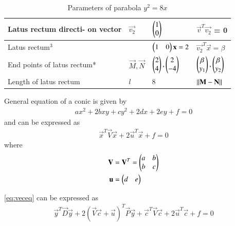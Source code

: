 \documentclass[journal,12pt,twocolumn]{IEEEtran}
\begin{document}
\begin{table}[!ht]
\begin{center}
\begin{tabular}{ | m{1.4cm} | m{1.0cm}| m{2.4cm} | m{2.3cm} | }
\hline
Latus \newline rectum \newline directi- \newline on vector & $\vec{v_2}$ & $\begin{pmatrix}1 \\ 0\end{pmatrix}$ & $\vec{v}^T\vec{v_2}$ = 0 \\ 
\hline
Latus \newline rectum$^{3}$ & & $\begin{pmatrix}1 & 0\end{pmatrix}\mathbf{x}=2$ & $\vec{v_2}^T\vec{x}=\beta$\\
\hline
End \newline points \newline of latus \newline rectum* & $\vec{M},\vec{N}$ & $\begin{pmatrix}2\\4\end{pmatrix},\begin{pmatrix}2\\-4\end{pmatrix}$ & $\begin{pmatrix}\beta \\ y_1\end{pmatrix},\begin{pmatrix}\beta \\ y_2\end{pmatrix}$ \\
\hline
Length \newline of latus \newline rectum & $l$ & 8 & $\left\lVert\mathbf{M}-\mathbf{N}\right\rVert$\\
\hline
\end{tabular}
\end{center}
\caption{Parameters of parabola $y^2=8x$}
\label{tab:table1}
\end{table}

\clearpage
\begin{lemma}
General equation of a conic is given by
\begin{align}
ax^2+2bxy+cy^2+2dx+2ey+f=0 \label{eq:geneq}
\end{align}
and can be expressed as 
\begin{align}
    \vec{x}^T\vec{V}\vec{x} + 2\vec{u}^T\vec{x} + f = 0 \label{eq:veceq}
\end{align}
where
\begin{align}
    \mathbf{V}&=\mathbf{V}^T=\begin{pmatrix}a & b\\b & c\end{pmatrix}
    \\
    \mathbf{u}&=\begin{pmatrix}d & e\end{pmatrix}
\end{align}
\end{lemma}

\begin{lemma}
\eqref{eq:veceq} can be expressed as 
\begin{align}
    \vec{y}^T\vec{D}\vec{y} + 2(\vec{V}\vec{c} + \vec{u})^T \vec{P}\vec{y} + \vec{c}^T\vec{V}\vec{c} + 2\vec{u}^T\vec{c} + f = 0 \label{eq:newveceq}
\end{align}
\end{lemma}
\end{document}

